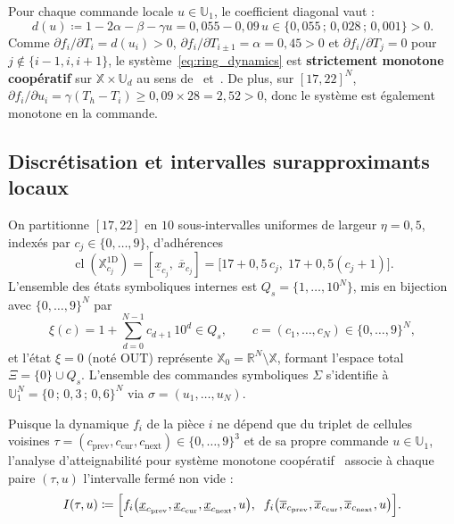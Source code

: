 \documentclass[11pt,a4paper]{article}
\theoremstyle{definition}
\theoremstyle{plain}
\newcommand{\R}{\mathbb{R}}
\newcommand{\X}{\mathbb{X}}
\newcommand{\U}{\mathbb{U}}
\newcommand{\cl}{\operatorname{cl}}
\begin{document}
Pour chaque commande locale $u \in \U_1$, le coefficient diagonal vaut :
\begin{equation}
  d(u) \coloneqq 1 - 2\alpha - \beta - \gamma u
  = 0{,}055 - 0{,}09\,u
  \in \{0{,}055\,;\, 0{,}028\,;\, 0{,}001\} > 0.
  \label{eq:diag_coeff}
\end{equation}
Comme $\partial f_i / \partial T_i = d(u_i) > 0$, $\partial f_i / \partial T_{i\pm 1} = \alpha = 0{,}45 > 0$ et $\partial f_i / \partial T_j = 0$ pour $j \notin \{i-1, i, i+1\}$, le système~\eqref{eq:ring_dynamics} est \textbf{strictement monotone coopératif} sur $\X \times \U_d$ au sens de~\cite[§1.1.3]{girard2024} et~\cite{angeli2003}. De plus, sur $[17, 22]^N$, $\partial f_i / \partial u_i = \gamma (T_h - T_i) \ge 0{,}09 \times 28 = 2{,}52 > 0$, donc le système est également monotone en la commande.

\subsection{Discrétisation et intervalles surapproximants locaux}

On partitionne $[17, 22]$ en $10$ sous-intervalles uniformes de largeur $\eta = 0{,}5$, indexés par $c_j \in \{0, \dots, 9\}$, d'adhérences
\[
  \cl(\X_{c_j}^{1\mathrm{D}}) = [\underline{x}_{c_j},\; \overline{x}_{c_j}]
  = \bigl[17 + 0{,}5\,c_j,\; 17 + 0{,}5(c_j + 1)\bigr].
\]
L'ensemble des états symboliques internes est $Q_s = \{1, \dots, 10^N\}$, mis en bijection avec $\{0, \dots, 9\}^N$ par
\[
  \xi(c) = 1 + \sum_{d=0}^{N-1} c_{d+1}\,10^d \in Q_s,
  \qquad c = (c_1, \dots, c_N) \in \{0, \dots, 9\}^N,
\]
et l'état $\xi = 0$ (noté $\mathrm{OUT}$) représente $\X_0 = \R^N \setminus \X$, formant l'espace total $\Xi = \{0\} \cup Q_s$. L'ensemble des commandes symboliques $\Sigma$ s'identifie à $\U_1^N = \{0\,;\, 0{,}3\,;\, 0{,}6\}^N$ via $\sigma = (u_1, \dots, u_N)$.

Puisque la dynamique $f_i$ de la pièce $i$ ne dépend que du triplet de cellules voisines $\tau = (c_{\mathrm{prev}}, c_{\mathrm{cur}}, c_{\mathrm{next}}) \in \{0, \dots, 9\}^3$ et de sa propre commande $u \in \U_1$, l'analyse d'atteignabilité pour système monotone coopératif~\cite[§1.1.3, Fig.~3a]{girard2024} associe à chaque paire $(\tau, u)$ l'intervalle fermé non vide :
\begin{equation}
  I(\tau, u) \coloneqq
  \Bigl[f_i\bigl(\underline{x}_{c_{\mathrm{prev}}}, \underline{x}_{c_{\mathrm{cur}}}, \underline{x}_{c_{\mathrm{next}}}, u\bigr),\;\;
        f_i\bigl(\overline{x}_{c_{\mathrm{prev}}}, \overline{x}_{c_{\mathrm{cur}}}, \overline{x}_{c_{\mathrm{next}}}, u\bigr)\Bigr].
  \label{eq:i_local}
\end{equation}
\end{document}
